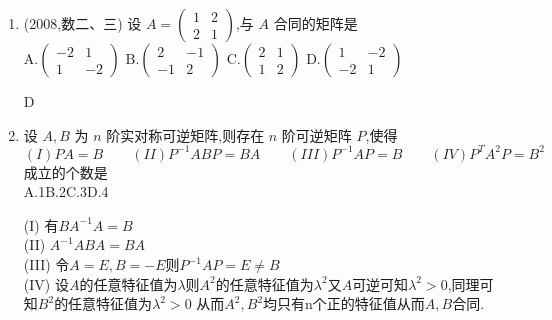 \documentclass[12pt, a4paper, oneside, UTF8]{ctexbook}
\begin{document}
\begin{enumerate}[label=\arabic*.,start=4]
    \item (2008,数二、三) 设 $ A = \begin{pmatrix} 1 & 2 \\ 2 & 1 \end{pmatrix} $,与 $ A $ 合同的矩阵是 \\
        A.$ \begin{pmatrix} -2 & 1 \\ 1 & -2 \end{pmatrix} $\qquad
        B.$ \begin{pmatrix} 2 & -1 \\ -1 & 2 \end{pmatrix} $\qquad
        C.$ \begin{pmatrix} 2 & 1 \\ 1 & 2 \end{pmatrix} $\qquad
        D.$\begin{pmatrix} 1 & -2 \\ -2 & 1 \end{pmatrix} $
    
    \begin{solution}
    D 
    \end{solution}
    
    \item 设 $ A, B $ 为 $ n $ 阶实对称可逆矩阵,则存在 $ n $ 阶可逆矩阵 $ P $,使得 \\
    $(I)PA=B\qquad (II)P^{-1}ABP=BA\qquad (III)P^{-1}AP=B\qquad(IV)P^{T}A^2P=B^2$ \\
    成立的个数是 \\
    A.1\qquad B.2\qquad C.3\qquad D.4
    
    \begin{solution}
    (I) 有$BA^{-1}A=B$  \\
    (II) $A^{-1}ABA=BA$  \\
    (III) 令$A=E,B=-E$则$P^{-1}AP=E\neq B$ \\
    (IV) 设$A$的任意特征值为$\lambda$则$A^2$的任意特征值为$\lambda^2$又$A$可逆可知$\lambda^2>0$,同理可知$B^2$的任意特征值为$\lambda^2>0$ 
    从而$A^2,B^2$均只有n个正的特征值从而$A,B$合同. 
    \end{solution}
\end{enumerate}
\end{document}

